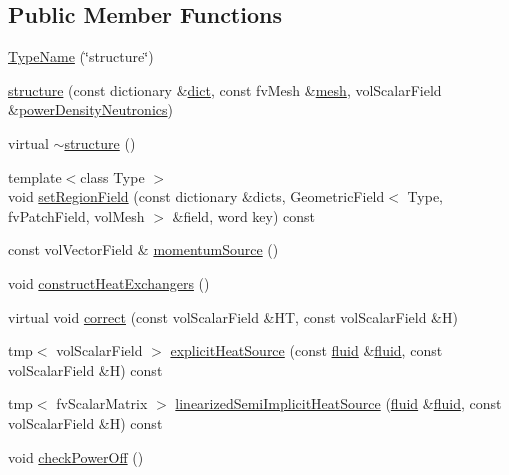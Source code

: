 \subsection*{Public Member Functions}
\begin{DoxyCompactItemize}
\item 
\hyperlink{classFoam_1_1structure_a15ddcef8a2e638c8566288229de86628}{Type\+Name} (\char`\"{}structure\char`\"{})
\item 
\hyperlink{classFoam_1_1structure_ac725130cc4964290bf27d822d4159f5b}{structure} (const dictionary \&\hyperlink{classFoam_1_1phaseBase_a19650e729ef6a0899b8fbe25f5238728}{dict}, const fv\+Mesh \&\hyperlink{classFoam_1_1phaseBase_a470f06cfb9b6ee887cd85d63de275607}{mesh}, vol\+Scalar\+Field \&\hyperlink{classFoam_1_1structure_a2eb0a266a288909b3480c78cc83348ed}{power\+Density\+Neutronics})
\item 
virtual \hyperlink{classFoam_1_1structure_a11f9e4dcea80a6c1277a1148b1464ac3}{$\sim$structure} ()
\item 
{\footnotesize template$<$class Type $>$ }\\void \hyperlink{classFoam_1_1structure_a9252328db1f82344da0559bc347f3e0a}{set\+Region\+Field} (const dictionary \&dicts, Geometric\+Field$<$ Type, fv\+Patch\+Field, vol\+Mesh $>$ \&field, word key) const
\item 
const vol\+Vector\+Field \& \hyperlink{classFoam_1_1structure_ae48e3602be4e34ee25797e126fac93a2}{momentum\+Source} ()
\item 
void \hyperlink{classFoam_1_1structure_a63bdd3eb3bd22e196cd0ea0c0cad5455}{construct\+Heat\+Exchangers} ()
\item 
virtual void \hyperlink{classFoam_1_1structure_a08cf6ccfed7f616074be223f0d2379f3}{correct} (const vol\+Scalar\+Field \&HT, const vol\+Scalar\+Field \&H)
\item 
tmp$<$ vol\+Scalar\+Field $>$ \hyperlink{classFoam_1_1structure_ac1d902746e45c59a040dc16151d08411}{explicit\+Heat\+Source} (const \hyperlink{classFoam_1_1fluid}{fluid} \&\hyperlink{classFoam_1_1fluid}{fluid}, const vol\+Scalar\+Field \&H) const
\item 
tmp$<$ fv\+Scalar\+Matrix $>$ \hyperlink{classFoam_1_1structure_aa9d78d8aeeb07a10342fbde2abf3bc98}{linearized\+Semi\+Implicit\+Heat\+Source} (\hyperlink{classFoam_1_1fluid}{fluid} \&\hyperlink{classFoam_1_1fluid}{fluid}, const vol\+Scalar\+Field \&H) const
\item 
void \hyperlink{classFoam_1_1structure_a5d0334a8e2ad05de13eda9fa499fc058}{check\+Power\+Off} ()
\item 

\end{DoxyCompactItemize}
